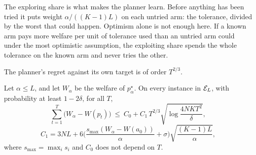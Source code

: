 The exploring share is what makes the planner learn. Before anything has been tried it puts weight $\alpha/((K-1)L)$ on each untried arm: the tolerance, divided by the worst that could happen. Optimism alone is not enough here. If a known arm pays more welfare per unit of tolerance used than an untried arm could under the most optimistic assumption, the exploiting share spends the whole tolerance on the known arm and never tries the other.

The planner's regret against its own target is of order $T^{2/3}$.

\begin{proposition}[Regret]\label{prop:regret}
Let $\alpha\le L$, and let $W_\alpha$ be the welfare of $p^\star_\alpha$. On every instance in $\mathcal{E}_L$, with probability at least $1-2\delta$, for all $T$,
\[
  \sum_{t=1}^T\big(W_\alpha-W(p_t)\big)\ \le\ C_0+C_1\,T^{2/3}\sqrt{\log\frac{4NKT^2}{\delta}},
\]
\[
  C_1=3NL+6\Big(\frac{s_{\max}(W_\alpha-W(a_0))}{\alpha}+\sigma\Big)\sqrt{\frac{(K-1)L}{\alpha}},
\]
where $s_{\max}=\max_is_i$ and $C_0$ does not depend on $T$.
\end{proposition}

